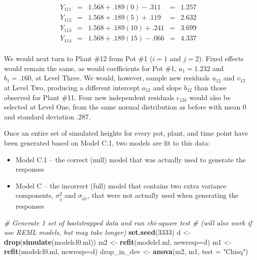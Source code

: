 \documentclass[
]{krantz}
\newenvironment{Shaded}{\begin{snugshade}}{\end{snugshade}}
\newcommand{\AttributeTok}[1]{\textcolor[rgb]{0.27,0.27,0.27}{#1}}
\newcommand{\CommentTok}[1]{\textcolor[rgb]{0.37,0.37,0.37}{\textit{#1}}}
\newcommand{\DecValTok}[1]{\textcolor[rgb]{0.06,0.06,0.06}{#1}}
\newcommand{\FunctionTok}[1]{\textcolor[rgb]{0.27,0.27,0.27}{\textbf{#1}}}
\newcommand{\NormalTok}[1]{#1}
\newcommand{\OtherTok}[1]{\textcolor[rgb]{0.37,0.37,0.37}{#1}}
\newcommand{\StringTok}[1]{\textcolor[rgb]{0.5,0.5,0.5}{#1}}
\providecommand{\tightlist}{%
  \setlength{\itemsep}{0pt}\setlength{\parskip}{0pt}}
\begin{document}
\[ \begin{array}{rcccl}
   Y_{111} & = & 1.568+.189(0)-.311 & = & 1.257 \\
   Y_{112} & = & 1.568+.189(5)+.119 & = & 2.632 \\
   Y_{113} & = & 1.568+.189(10)+.241 & = & 3.699 \\
   Y_{114} & = & 1.568+.189(15)-.066 & = & 4.337 \\
   \end{array} \]

We would next turn to Plant \#12 from Pot \#1 (\(i=1\) and \(j=2\)). Fixed effects would remain the same, as would coefficients for Pot \#1, \(a_{1} = 1.232\) and \(b_{1} = .160\), at Level Three. We would, however, sample new residuals \(u_{12}\) and \(v_{12}\) at Level Two, producing a different intercept \(a_{12}\) and slope \(b_{12}\) than those observed for Plant \#11. Four new independent residuals \(\epsilon_{12k}\) would also be selected at Level One, from the same normal distribution as before with mean 0 and standard deviation .287.

Once an entire set of simulated heights for every pot, plant, and time point have been generated based on Model C.1, two models are fit to this data:

\begin{itemize}
\tightlist
\item
  Model C.1 -- the correct (null) model that was actually used to generate the responses
\item
  Model C -- the incorrect (full) model that contains two extra variance components, \(\sigma_{\tilde{v}}^{2}\) and \(\sigma_{\tilde{u}\tilde{v}}\), that were not actually used when generating the responses
\end{itemize}

\begin{Shaded}
\begin{Highlighting}[]
\CommentTok{\# Generate 1 set of bootstrapped data and run chi{-}square test}
\CommentTok{\#  (will also work if use REML models, but may take longer)}
\FunctionTok{set.seed}\NormalTok{(}\DecValTok{3333}\NormalTok{)}
\NormalTok{d }\OtherTok{\textless{}{-}} \FunctionTok{drop}\NormalTok{(}\FunctionTok{simulate}\NormalTok{(modelcl0.ml))}
\NormalTok{m2 }\OtherTok{\textless{}{-}} \FunctionTok{refit}\NormalTok{(modelcl.ml, }\AttributeTok{newresp=}\NormalTok{d)}
\NormalTok{m1 }\OtherTok{\textless{}{-}} \FunctionTok{refit}\NormalTok{(modelcl0.ml, }\AttributeTok{newresp=}\NormalTok{d)}
\NormalTok{drop\_in\_dev }\OtherTok{\textless{}{-}} \FunctionTok{anova}\NormalTok{(m2, m1, }\AttributeTok{test =} \StringTok{"Chisq"}\NormalTok{)}
\end{Highlighting}
\end{Shaded}
\end{document}
